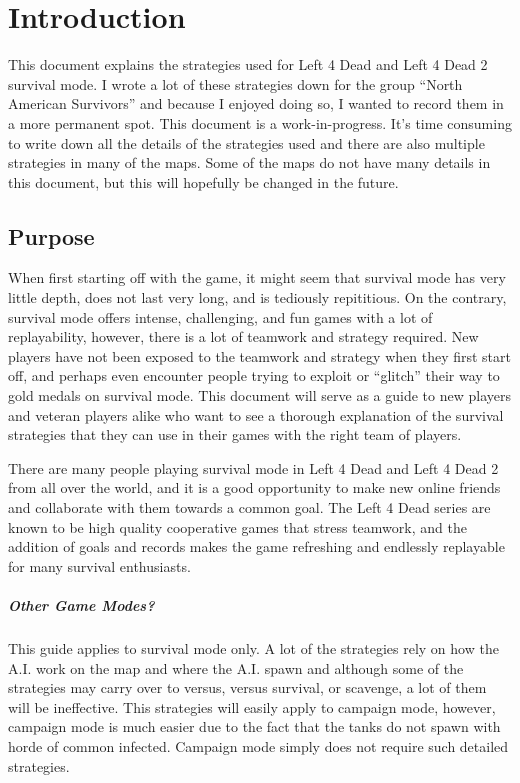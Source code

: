 \chapter{Introduction}
This document explains the strategies used for Left 4 Dead and Left 4 Dead 2 survival mode. I wrote a lot of these strategies down for the group ``North American Survivors'' and because I enjoyed doing so, I wanted to record them in a more permanent spot. This document is a work-in-progress. It's time consuming to write down all the details of the strategies used and there are also multiple strategies in many of the maps. Some of the maps do not have many details in this document, but this will hopefully be changed in the future.

\section{Purpose}
When first starting off with the game, it might seem that survival mode has very little depth, does not last very long, and is tediously repititious. On the contrary, survival mode offers intense, challenging, and fun games with a lot of replayability, however, there is a lot of teamwork and strategy required. New players have not been exposed to the teamwork and strategy when they first start off, and perhaps even encounter people trying to exploit or ``glitch'' their way to gold medals on survival mode. This document will serve as a guide to new players and veteran players alike who want to see a thorough explanation of the survival strategies that they can use in their games with the right team of players.

There are many people playing survival mode in Left 4 Dead and Left 4 Dead 2 from all over the world, and it is a good opportunity to make new online friends and collaborate with them towards a common goal. The Left 4 Dead series are known to be high quality cooperative games that stress teamwork, and the addition of goals and records makes the game refreshing and endlessly replayable for many survival enthusiasts.

\paragraph{Other Game Modes?}
This guide applies to survival mode only. A lot of the strategies rely on how the A.I. work on the map and where the A.I. spawn and although some of the strategies may carry over to versus, versus survival, or scavenge, a lot of them will be ineffective. This strategies will easily apply to campaign mode, however, campaign mode is much easier due to the fact that the tanks do not spawn with horde of common infected. Campaign mode simply does not require such detailed strategies.

